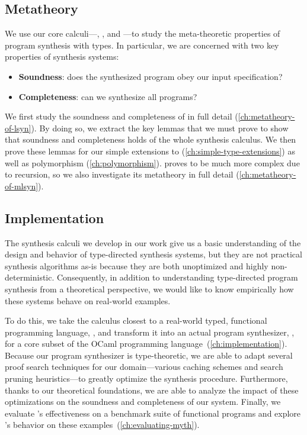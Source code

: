 \subsection{Metatheory}
We use our core calculi---\lsyn{}, \mlsyn{}, and \systemfsyn{}---to study the meta-theoretic properties of program synthesis with types.
In particular, we are concerned with two key properties of synthesis systems:
\begin{itemize}
  \item \textbf{Soundness}: does the synthesized program obey our input specification?
  \item \textbf{Completeness}: can we synthesize all programs?
\end{itemize}
We first study the soundness and completeness of \lsyn{} in full detail (\autoref{ch:metatheory-of-lsyn}).
By doing so, we extract the key lemmas that we must prove to show that soundness and completeness holds of the whole synthesis calculus.
We then prove these lemmas for our simple extensions to \lsyn{} (\autoref{ch:simple-type-extensions}) as well as polymorphism (\autoref{ch:polymorphism}).
\mlsyn{} proves to be much more complex due to recursion, so we also investigate its metatheory in full detail (\autoref{ch:metatheory-of-mlsyn}).

\subsection{Implementation}
The synthesis calculi we develop in our work give us a basic understanding of the design and behavior of type-directed synthesis systems, but they are not practical synthesis algorithms as-is because they are both unoptimized and highly non-deterministic.
Consequently, in addition to understanding type-directed program synthesis from a theoretical perspective, we would like to know empirically how these systems behave on real-world examples.

To do this, we take the calculus closest to a real-world typed, functional programming language, \mlsyn{}, and transform it into an actual program synthesizer, \myth{}, for a core subset of the OCaml programming language~(\autoref{ch:implementation}).
Because our program synthesizer is type-theoretic, we are able to adapt several proof search techniques for our domain---various caching schemes and search pruning heuristics---to greatly optimize the synthesis procedure.
Furthermore, thanks to our theoretical foundations, we are able to analyze the impact of these optimizations on the soundness and completeness of our system.
Finally, we evaluate \myth{}'s effectiveness on a benchmark suite of functional programs and explore \myth{}'s behavior on these examples~(\autoref{ch:evaluating-myth}).

